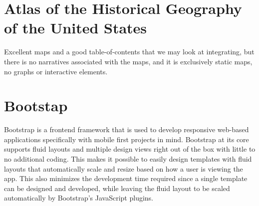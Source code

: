 \documentclass[conference]{IEEEtran}
\begin{document}


\IEEEpeerreviewmaketitle

\section{Atlas of the Historical Geography of the United States~\cite{us-historical-atlas-2014}}

Excellent maps and a good table-of-contents that we may look at integrating, but there is no narratives associated with the maps, and it is exclusively static maps, no graphs or interactive elements.

\section{Bootstap~\cite{bootstrap-2014}}

Bootstrap is a frontend framework that is used to develop responsive web-based applications specifically with mobile first projects in mind.  Bootstrap at its core supports fluid layouts and multiple design views right out of the box with little to no additional coding.  This makes it possible to easily design templates with fluid layouts that automatically scale and resize based on how a user is viewing the app.  This also minimizes the development time required since a single
template can be designed and developed, while leaving the fluid layout to be scaled automatically by Bootstrap’s JavaScript plugins.
\end{document}

